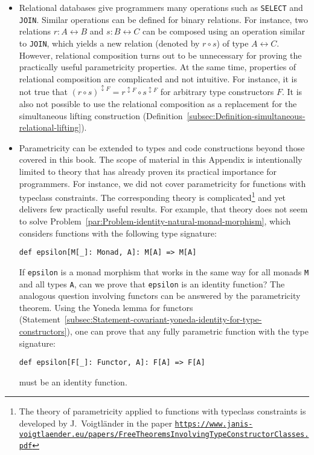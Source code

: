 \begin{itemize}
\item Relational databases give programmers many operations such as \lstinline!SELECT!
and \lstinline!JOIN!. Similar operations can be defined for binary
relations. For instance, two relations $r:A\leftrightarrow B$ and
$s:B\leftrightarrow C$ can be composed using an operation similar
to \lstinline!JOIN!, which yields a new relation (denoted by $r\circ s$)
of type $A\leftrightarrow C$. However, relational composition turns
out to be unnecessary for proving the practically useful parametricity
properties. At the same time, properties of relational composition
are complicated and not intuitive. For instance, it is not true that
$(r\circ s)^{\updownarrow F}=r^{\updownarrow F}\circ s^{\updownarrow F}$
for arbitrary type constructors $F$. It is also not possible to use
the relational composition as a replacement for the simultaneous lifting
construction (Definition~\ref{subsec:Definition-simultaneous-relational-lifting}).
\item Parametricity can be extended to types and code constructions beyond
those covered in this book. The scope of material in this Appendix
is intentionally limited to theory that has already proven its practical
importance for programmers. For instance, we did not cover parametricity
for functions with typeclass constraints. The corresponding theory
is complicated\footnote{The theory of parametricity applied to functions with typeclass constraints
is developed by J.~Voigtl\"ander
in the paper \texttt{\href{https://www.janis-voigtlaender.eu/papers/FreeTheoremsInvolvingTypeConstructorClasses.pdf}{https://www.janis-voigtlaender.eu/papers/FreeTheoremsInvolvingTypeConstructorClasses.pdf}}} and yet delivers few practically useful results. For example, that
theory does not seem to solve Problem~\ref{par:Problem-identity-natural-monad-morphism},
which considers functions with the following type signature:
\begin{lstlisting}
def epsilon[M[_]: Monad, A]: M[A] => M[A]
\end{lstlisting}
If \lstinline!epsilon! is a monad morphism that works in the same
way for all monads \lstinline!M! and all types \lstinline!A!, can
we prove that \lstinline!epsilon! is an identity function? The analogous
question involving functors can be answered by the parametricity theorem.
Using the Yoneda lemma for functors (Statement~\ref{subsec:Statement-covariant-yoneda-identity-for-type-constructors}),
one can prove that any fully parametric function with the type signature:
\begin{lstlisting}
def epsilon[F[_]: Functor, A]: F[A] => F[A]
\end{lstlisting}
must be an identity function.
\end{itemize}

